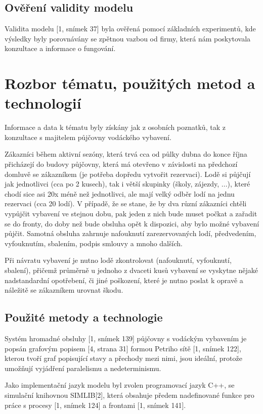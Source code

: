 \documentclass[a4paper, 12pt, hidelinks]{article}
\begin{document}
\subsection{Ověření validity modelu}
Validita modelu [1, snímek 37] byla ověřená pomocí základních experimentů, kde výsledky byly porovnávány se zpětnou vazbou od firmy, která nám poskytovala konzultace a informace o fungování. 

\newpage

\section{Rozbor tématu, použitých metod a technologií}
Informace a data k tématu byly získány jak z osobních poznatků, tak z konzultace s majitelem půjčovny vodáckého vybavení.

Zákazníci během aktivní sezóny, která trvá cca od půlky dubna do konce října přicházejí do budovy půjčovny, která má otevřeno v závislosti na předchozí domluvě se zákazníkem (je potřeba dopředu vytvořit rezervaci). Lodě si půjčují jak jednotlivci (cca po 2 kusech), tak i větší skupinky (školy, zájezdy, ...), které chodí sice asi 20x méně než jednotlivci, ale mají velký odběr lodí na jednu rezervaci (cca 20 lodí). V případě, že se stane, že by dva různí zákazníci chtěli vypůjčit vybavení ve stejnou dobu, pak jeden z nich bude muset počkat a zařadit se do fronty, do doby než bude obsluha opět k dispozici, aby bylo možné vybavení půjčit. Samotná obsluha zahrnuje nafouknutí zarezervovaných lodí, předvedením, vyfouknutím, sbalením, podpis smlouvy a mnoho dalších.

Při návratu vybavení je nutno lodě zkontrolovat (nafouknutí, vyfouknutí, sbalení), přičemž průměrně u jednoho z dvaceti kusů vybavení se vyskytne nějaké nadstandardní opotřebení, či jiné poškození, které je nutno poslat k opravě a náležitě se zákazníkem urovnat škodu. 

\subsection{Použité metody a technologie}
Systém hromadné obsluhy [1, snímek 139] půjčovny s vodáckým vybavením je popsán grafovým popisem [4, strana 31] formou Petriho sítě [1, snímek 122], kterou tvoří graf popisující stavy a přechody mezi nimi, jsou ideální, protože umožňují vyjádření paralelismu a nedeterminismu.

Jako implementační jazyk modelu byl zvolen programovací jazyk C++, se simulační knihovnou SIMLIB[2], která obsahuje předem nadefinované funkce pro práce s procesy [1, snímek 124] a frontami [1, snímek 141].
\end{document}
